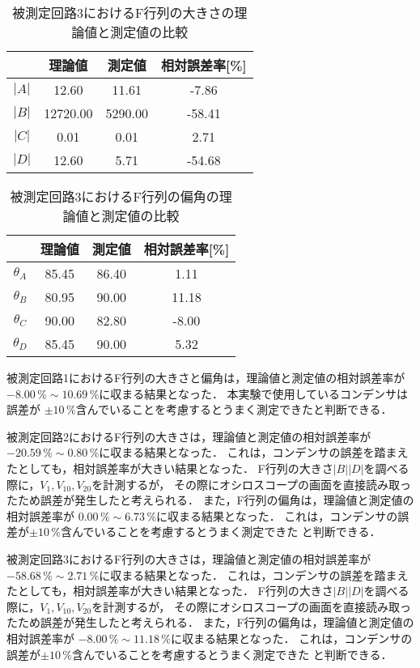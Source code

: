 \newpage

\begin{table}[!ht]
    \centering
    \caption{被測定回路3におけるF行列の大きさの理論値と測定値の比較}
    \begin{tabular}{c|ccc}
    \hline
        & 理論値 & 測定値 & 相対誤差率[\%] \\ \hline
        $|A|$ & 12.60 & 11.61 & -7.86 \\ 
        $|B|$ & 12720.00 & 5290.00 & -58.41 \\ 
        $|C|$ & 0.01 & 0.01 & 2.71 \\ 
        $|D|$ & 12.60 & 5.71 & -54.68 \\ \hline
    \end{tabular}
\end{table}

\begin{table}[!ht]
    \centering
    \caption{被測定回路3におけるF行列の偏角の理論値と測定値の比較}
    \begin{tabular}{c|ccc}
    \hline
        & 理論値 & 測定値 & 相対誤差率[\%] \\ \hline
        $\theta_A$ & 85.45 & 86.40 & 1.11 \\ 
        $\theta_B$ & 80.95 & 90.00 & 11.18 \\
        $\theta_C$ & 90.00 & 82.80 & -8.00 \\
        $\theta_D$ & 85.45 & 90.00 & 5.32 \\ \hline
    \end{tabular}
\end{table}

被測定回路1におけるF行列の大きさと偏角は，理論値と測定値の相対誤差率が
$-8.00\,\% \sim 10.69\,\%$に収まる結果となった．
本実験で使用しているコンデンサは誤差が
$\pm10\,\%$含んでいることを考慮するとうまく測定できたと判断できる．

被測定回路2におけるF行列の大きさは，理論値と測定値の相対誤差率が
$-20.59\,\% \sim 0.80\,\%$に収まる結果となった．
これは，コンデンサの誤差を踏まえたとしても，相対誤差率が大きい結果となった．
F行列の大きさ$|B||D|$を調べる際に，$V_1,V_{10},V_{20}$を計測するが，
その際にオシロスコープの画面を直接読み取ったため誤差が発生したと考えられる．
また，F行列の偏角は，理論値と測定値の相対誤差率が
$0.00\,\% \sim 6.73\,\%$に収まる結果となった．
これは，コンデンサの誤差が$\pm10\,\%$含んでいることを考慮するとうまく測定できた
と判断できる．

被測定回路3におけるF行列の大きさは，理論値と測定値の相対誤差率が
$-58.68\,\% \sim 2.71\,\%$に収まる結果となった．
これは，コンデンサの誤差を踏まえたとしても，相対誤差率が大きい結果となった．
F行列の大きさ$|B||D|$を調べる際に，$V_1,V_{10},V_{20}$を計測するが，
その際にオシロスコープの画面を直接読み取ったため誤差が発生したと考えられる．
また，F行列の偏角は，理論値と測定値の相対誤差率が
$-8.00\,\% \sim 11.18\,\%$に収まる結果となった．
これは，コンデンサの誤差が$\pm10\,\%$含んでいることを考慮するとうまく測定できた
と判断できる．


